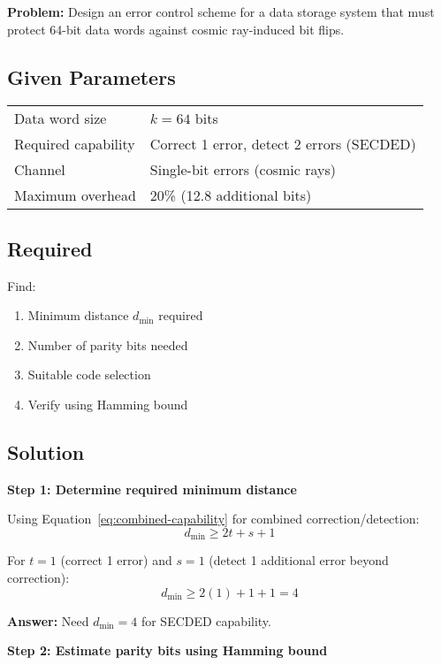 \textbf{Problem:} Design an error control scheme for a data storage system that must protect 64-bit data words against cosmic ray-induced bit flips.

\subsection*{Given Parameters}

\begin{tabular}{@{}ll@{}}
Data word size & $k = 64$ bits \\
Required capability & Correct 1 error, detect 2 errors (SECDED) \\
Channel & Single-bit errors (cosmic rays) \\
Maximum overhead & 20\% (12.8 additional bits) \\
\end{tabular}

\subsection*{Required}

Find:
\begin{enumerate}
\item Minimum distance $d_{\min}$ required
\item Number of parity bits needed
\item Suitable code selection
\item Verify using Hamming bound
\end{enumerate}

\subsection*{Solution}

\textbf{Step 1: Determine required minimum distance}

Using Equation~\ref{eq:combined-capability} for combined correction/detection:
\begin{equation}
d_{\min} \geq 2t + s + 1
\end{equation}

For $t = 1$ (correct 1 error) and $s = 1$ (detect 1 additional error beyond correction):
\begin{equation}
d_{\min} \geq 2(1) + 1 + 1 = 4
\end{equation}

\textbf{Answer:} Need $d_{\min} = 4$ for SECDED capability.

\textbf{Step 2: Estimate parity bits using Hamming bound}

